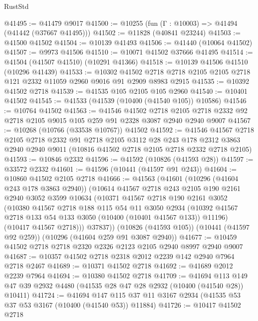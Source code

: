 \begin{lexlean}{RustStd}
\begin{coremodule}
@41495 := @41479 @9017
@41500 := @10255 (fun (Γ : @10003) => @41494 (@41442 (@37667 @41495)))
@41502 := @11828 (@40841 @23244)
@41503 := @41500 @41502
@41504 := @10139 @41493
@41506 := @41440 (@10064 @41502)
@41507 := @9973 @41506
@41510 := @10071 @41502 @37666 @41495
@41514 := @41504 (@41507 @41510) (@10291 @41366)
@41518 := @10139 @41506 @41510 (@10296 @41439)
@41533 := @10302
    @41502
    @2718
    @2718
    @2105
    @2105
    @2718
    @121
    @2332
    @11059
    @2960
    @9016
    @91
    @2909
    @8983
    @2915
@41535 := @10392 @41502 @2718
@41539 := @41535 @105 @2105 @105 @2960
@41540 := @10401 @41502
@41545 := @41533 (@41539 (@10400 (@41540 @105)) @10586)
@41546 := @10764 @41502
@41563 := @41546
    @41502
    @2718
    @2105
    @2718
    @2332
    @92
    @2718
    @2105
    @9015
    @105
    @259
    @91
    @2328
    @3087
    @2940
    @2940
    @9007
@41567 := @10268 (@10766 (@33538 @10767)) @41502
@41592 := @41546
    @41567
    @2718
    @2105
    @2718
    @2332
    @91
    @2718
    @2105
    @3112
    @28
    @243
    @178
    @2312
    @3863
    @2940
    @2940
    @9011
    (@10816 @41502 @2718 @2105 @2718 @2332 @2718 @2105)
@41593 := @10846 @2332
@41596 := @41592 (@10826 (@41593 @28))
@41597 := @33572 @2332
@41601 := @41596 (@10441 (@41597 @91 @243))
@41604 := @10860 @41502 @2105 @2718
@41666 := @41563
    (@41601
      (@10296 (@41604 @243 @178 @3863 @2940))
      (@10614
        @41567
        @2718
        @243
        @2105
        @190
        @2161
        @2940
        @3052
        @3599
        @10634
        (@10371
          @41567
          @2718
          @190
          @2161
          @3052
          (@10380
            @41567
            @2718
            @188
            @115
            @54
            @11
            @3050
            @2934
            (@10392 @41567 @2718 @133 @54 @133 @3050 (@10400 (@10401 @41567 @133)) @11196)
            (@10417 @41567 @2718)))
        @37837))
    (@10826 (@41593 @105))
    (@10441 (@41597 @92 @259))
    (@10296 (@41604 @259 @91 @3087 @2940))
@41677 := @10459 @41502 @2718 @2718 @2320 @2326 @2123 @2105 @2940 @8997 @2940 @9007
@41687 := @10357 @41502 @2718 @2318 @2012 @2239 @142 @2940 @7964 @2718 @2467
@41689 := @10371 @41502 @2718
@41692 := @41689 @2012 @2239 @7964
@41694 := @10380 @41502 @2718
@41709 := @41694
    @113
    @149
    @47
    @39
    @2932
    @4480
    (@41535 @28 @47 @28 @2932 (@10400 (@41540 @28)) @10411)
@41724 := @41694
    @147
    @115
    @37
    @11
    @3167
    @2934
    (@41535 @53 @37 @53 @3167 (@10400 (@41540 @53)) @11884)
@41726 := @10417 @41502 @2718

\end{coremodule}
\end{lexlean}
